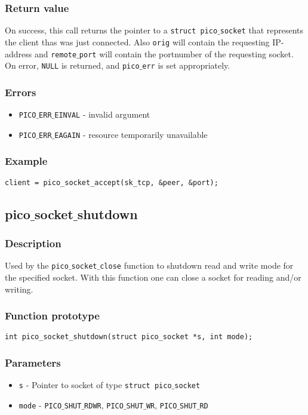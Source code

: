 \subsubsection*{Return value}
On success, this call returns the pointer to a \texttt{struct pico$\_$socket} that
represents the client thas was just connected. Also \texttt{orig} will contain the requesting
IP-address and \texttt{remote$\_$port} will contain the portnumber of the requesting socket.
On error, \texttt{NULL} is returned, and \texttt{pico$\_$err} is set appropriately.

\subsubsection*{Errors}
\begin{itemize}[noitemsep]
\item \texttt{PICO$\_$ERR$\_$EINVAL} - invalid argument
\item \texttt{PICO$\_$ERR$\_$EAGAIN} - resource temporarily unavailable
\end{itemize}

\subsubsection*{Example}
\begin{verbatim}
client = pico_socket_accept(sk_tcp, &peer, &port);
\end{verbatim}


\subsection{pico$\_$socket$\_$shutdown}

\subsubsection*{Description}
Used by the \texttt{pico$\_$socket$\_$close} function to shutdown read and write mode for
the specified socket. With this function one can close a socket for reading
and/or writing.

\subsubsection*{Function prototype}
\begin{verbatim}
int pico_socket_shutdown(struct pico_socket *s, int mode);
\end{verbatim}

\subsubsection*{Parameters}
\begin{itemize}[noitemsep]
\item \texttt{s} - Pointer to socket of type \texttt{struct pico$\_$socket}
\item \texttt{mode} - \texttt{PICO$\_$SHUT$\_$RDWR}, \texttt{PICO$\_$SHUT$\_$WR}, \texttt{PICO$\_$SHUT$\_$RD}
\end{itemize}

